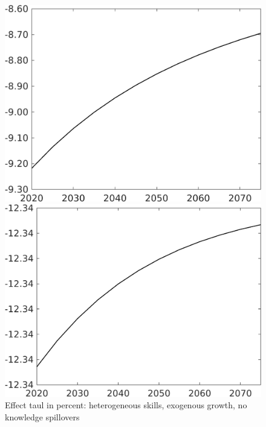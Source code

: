 \documentclass[12pt]{article}
\begin{document}
\begin{figure}[h!!]
	\centering
	\caption{Effect taul in percent: heterogeneous skills, exogenous growth, no knowledge spillovers }\label{fig:LF_BAU_nsk0_xgr1_noknow}
	\begin{minipage}[]{0.32\textwidth}
		\includegraphics[width=1\textwidth]{../../codding_model/own_basedOnFried/optimalPol_010922_revision/figures/all_13Sept22/CompTaul_LFBAUPer_Reg0_Emnet_spillover0_nsk0_xgr1_knspil1_sep1_countec0_GovRev0_etaa0.79.png}
	\end{minipage}	
	\begin{minipage}[]{0.32\textwidth}
		\includegraphics[width=1\textwidth]{../../codding_model/own_basedOnFried/optimalPol_010922_revision/figures/all_13Sept22/CompTaul_LFBAUPer_Reg0_hh_spillover0_nsk0_xgr1_knspil1_sep1_countec0_GovRev0_etaa0.79.png}

\end{minipage}
\end{figure}
\end{document}
